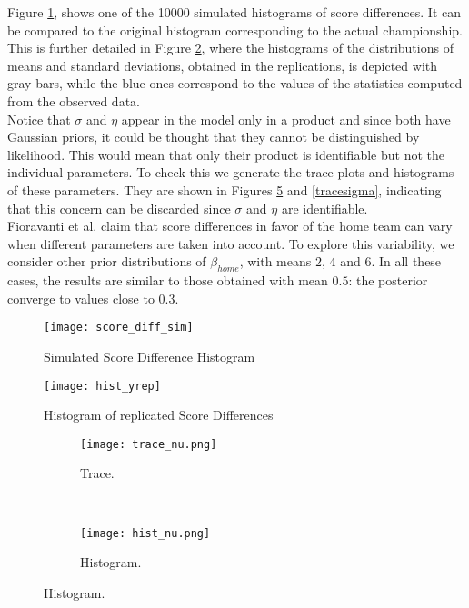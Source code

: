\documentclass[]{article}
\begin{document}
Figure \ref{fig:score_diffsim}, shows one of the 10000 simulated histograms of score differences. It can be compared to the original histogram corresponding to the actual championship. This is further detailed in Figure \ref{fig:hist_yrep}, where the histograms of the distributions of means and standard deviations, obtained in the replications, is depicted with gray bars, while the blue ones correspond to the values of the statistics computed from the observed data.\\

Notice that $\sigma$ and $\eta$ appear in the model only in a product and since both have Gaussian priors, it could be thought that they cannot be distinguished by likelihood. This would mean that only their product is identifiable but not the individual parameters. To check this we generate the trace-plots and histograms of these parameters. They are shown in Figures \ref{tracenu} and \ref{tracesigma}, indicating that this concern can be discarded since $\sigma$ and $\eta$ are identifiable.\\ 

Fioravanti et al. \cite{fioravanti2021home} claim that score differences in favor of the home team can vary when different parameters are taken into account. To explore this variability, we consider other prior distributions of $\beta_{home}$, with means $2$, $4$ and $6$. In all these cases, the results are similar to those obtained with mean $0.5$: the posterior converge to values close to $0.3$. \\


\begin{figure}[hbt!]
	\centering
	\caption{Simulated Score Difference Histogram}
	\texttt{[image: score\_diff\_sim]}
	 \label{fig:score_diffsim}
\end{figure}

\begin{figure}[hbt!]
	\centering
	\caption{Histogram of replicated Score Differences}
	\texttt{[image: hist\_yrep]}
	\label{fig:hist_yrep}
\end{figure}


\begin{figure}[hbt!]
	\centering
	\caption{Trace and Histogram of Nu}		
	\begin{subfigure}[t]{0.47\textwidth}
		\centering
		\scriptsize
		\texttt{[image: trace\_nu.png]}
		\caption{Trace. \label{fig:trace_nu}}
	\end{subfigure}%
	~ 
	\begin{subfigure}[t]{0.47\textwidth}
		\centering
		\scriptsize
		\texttt{[image: hist\_nu.png]}
		\caption{Histogram. \label{fig:hist_nu}}
	\end{subfigure}
	\label{tracenu}
\end{figure}
\end{document}
